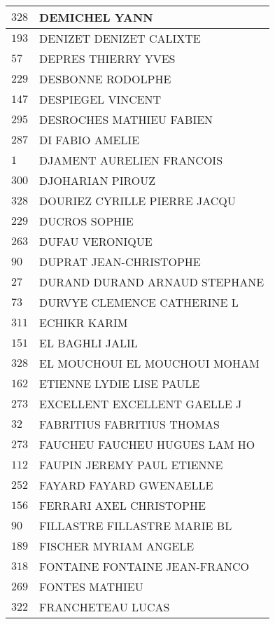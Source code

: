\begin{xltabular}{\linewidth}{|l|X|}
    \hline
    $328$ & DEMICHEL YANN \\
    \hline
    $193$ & DENIZET DENIZET CALIXTE \\
    \hline
    $57$ & DEPRES THIERRY YVES \\
    \hline
    $229$ & DESBONNE RODOLPHE \\
    \hline
    $147$ & DESPIEGEL VINCENT \\
    \hline
    $295$ & DESROCHES MATHIEU FABIEN \\
    \hline
    $287$ & DI FABIO AMELIE \\
    \hline
    $1$ & DJAMENT AURELIEN FRANCOIS \\
    \hline
    $300$ & DJOHARIAN PIROUZ \\
    \hline
    $328$ & DOURIEZ CYRILLE PIERRE JACQU \\
    \hline
    $229$ & DUCROS SOPHIE \\
    \hline
    $263$ & DUFAU VERONIQUE \\
    \hline
    $90$ & DUPRAT JEAN-CHRISTOPHE \\
    \hline
    $27$ & DURAND DURAND ARNAUD STEPHANE \\
    \hline
    $73$ & DURVYE CLEMENCE CATHERINE L \\
    \hline
    $311$ & ECHIKR KARIM \\
    \hline
    $151$ & EL BAGHLI JALIL \\
    \hline
    $328$ & EL MOUCHOUI EL MOUCHOUI MOHAM \\
    \hline
    $162$ & ETIENNE LYDIE LISE PAULE \\
    \hline
    $273$ & EXCELLENT EXCELLENT GAELLE J \\
    \hline
    $32$ & FABRITIUS FABRITIUS THOMAS \\
    \hline
    $273$ & FAUCHEU FAUCHEU HUGUES LAM HO \\
    \hline
    $112$ & FAUPIN JEREMY PAUL ETIENNE \\
    \hline
    $252$ & FAYARD FAYARD GWENAELLE \\
    \hline
    $156$ & FERRARI AXEL CHRISTOPHE \\
    \hline
    $90$ & FILLASTRE FILLASTRE MARIE BL \\
    \hline
    $189$ & FISCHER MYRIAM ANGELE \\
    \hline
    $318$ & FONTAINE FONTAINE JEAN-FRANCO \\
    \hline
    $269$ & FONTES MATHIEU \\
    \hline
    $322$ & FRANCHETEAU LUCAS \\

\end{xltabular}

